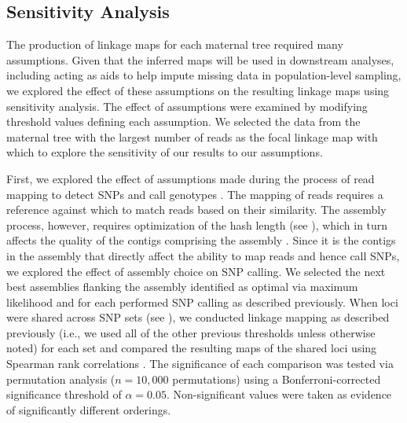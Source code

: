 \documentclass[11pt]{article}
\begin{document}
\subsection*{Sensitivity Analysis}
The production of linkage maps for each maternal tree required many assumptions.
Given that the inferred maps will be used in downstream analyses, including acting as aids
to help impute missing data in population-level sampling, we explored the effect of these assumptions on 
the resulting linkage maps using sensitivity analysis. The effect of assumptions 
were examined by modifying threshold values defining each assumption. We selected the
data from the maternal tree with the largest number of reads as the focal linkage map with which to explore
the sensitivity of our results to our assumptions.

First, we explored the effect of assumptions made during the process of read mapping to detect SNPs and call genotypes 
\citep[cf.][]{Pool:2010}. The mapping of reads requires a reference against which to match reads based on their similarity. 
The assembly process, however, requires optimization of the hash length (see ), 
which in turn affects the quality of the contigs comprising the assembly \citep{Earl:2011gt,Salzberg:2011fr,Bradnam:2013uu}.  
Since it is the contigs in the assembly that directly affect the ability to map reads and hence call SNPs, we explored the effect 
of assembly choice on SNP calling. We selected the next best assemblies flanking the assembly identified as optimal via maximum likelihood 
and for each performed SNP calling as described previously. When loci were shared across SNP sets (see ), we 
conducted linkage mapping as described previously (i.e., we used all of the other previous thresholds unless otherwise noted) for each 
set and compared the resulting maps of the shared loci using Spearman rank correlations \citep{Spearman:1904}.  
The significance of each comparison was tested via permutation analysis ($n = 10,000$ permutations) using a Bonferroni-corrected significance 
threshold of $\alpha = 0.05$. Non-significant values were taken as evidence of significantly different orderings.
\end{document}
